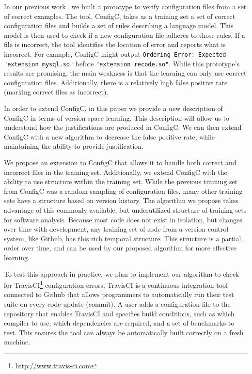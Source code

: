In our previous work~\cite{Santolucito2016} we built a prototype to verify configuration files from a set of correct examples.
The tool, ConfigC, takes as a training set a set of correct configuration files and builds a set of rules describing a language model.
This model is then used to check if a new configuration file adheres to those rules.
If a file is incorrect, the tool identifies the location of error and reports what is incorrect.
For example, ConfigC might output \texttt{Ordering Error: Expected "extension mysql.so"} before \texttt{"extension recode.so"}.
While this prototype's results are promising, the main weakness is that the learning can only use correct configuration files.
Additionally, there is a relatively high false positive rate (marking correct files as incorrect).

In order to extend ConfigC, in this paper we provide a new description of ConfigC in terms of version space learning.
This description will allow us to understand how the justifications are produced in ConfigC.
We can then extend ConfigC with a new algorithm to decrease the false positive rate, while maintaining the ability to provide justification.

We propose an extension to ConfigC that allows it to handle both correct and incorrect files in the training set.
Additionally, we extend ConfigC with the ability to use structure within the training set.
While the previous training set from ConfigC was a random sampling of configuration files, many other training sets have a structure based on version history.
The algorithm we propose takes advantage of this commonly available, but underutilized structure of training sets for software analysis.
Because most code does not exist in isolation, but changes over time with development, any training set of code from a version control system, like Github, has this rich temporal structure. 
This structure is a partial order over time, and can be used by our proposed algorithm for more effective learning.

To test this approach in practice, we plan to implement our algorithm to check for TravisCI\footnote{\url{http://www.travis-ci.com}} configuration errors.
TravisCI is a continuous integration tool connected to Github that allows programmers to automatically run their test suite on every code update (commit).
A user adds a configuration file to the repository that enables TravisCI and specifies build conditions, such as which compiler to use, which dependencies are required, and a set of benchmarks to test.
This ensures the tool can always be automatically built correctly on a fresh machine.

